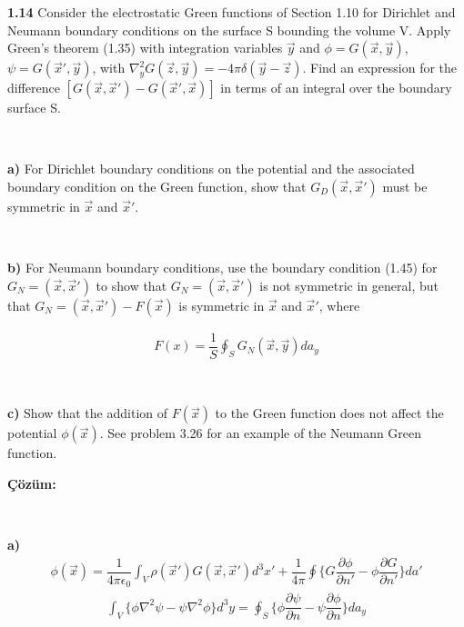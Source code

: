 \begin{flushleft}
   
	\textbf{1.14} Consider the electrostatic Green functions of Section 1.10 for Dirichlet and Neumann boundary conditions on the surface S bounding the volume V. Apply Green's theorem (1.35) with integration variables $\Vec{y}$ and $\phi = G(\Vec{x},\Vec{y})$, $\psi = G (\vec{x}', \Vec{y})$, with $\nabla^{2}_{y}G(\Vec{z},\Vec{y}) = -4\pi \delta  (\Vec{y}-\Vec{z})$. Find an expression for the difference $[ G(\Vec{x} ,\vec{x}' ) - G ( \vec{x}' , \Vec{x} )]$ in terms of an integral over the boundary surface S. 

\

\textbf{a)} For Dirichlet boundary conditions on the potential and the associated boundary condition on the Green function, show that $G_{D}(\Vec{x},\vec{x}') $	must be symmetric in $\Vec{x}$ and $\vec{x}'$.

\

\textbf{b)} For Neumann boundary conditions, use the boundary condition (1.45) for $G_{N} = ( \Vec{x} , \vec{x}')$ to show that $G_{N} = ( \Vec{x} , \vec{x}')$ is not symmetric in general, but that $G_{N} = ( \Vec{x} , \vec{x}') - F (\Vec{x})$ is symmetric in $\Vec{x}$ and $\vec{x}'$, where

\begin{align*}
    F (x) = \dfrac{1}{S} \oint_{S} G_{N} ( \Vec{x}, \Vec{y} ) da_{y}
\end{align*}

\

\textbf{c)} Show that the addition of $F(\Vec{x})$ to the Green function does not affect the potential $\phi(\Vec{x})$. See problem 3.26 for an example of the Neumann Green function.	
\end{flushleft}

  
\textbf{Çözüm:}

\

\textbf{a)}
\begin{align*}
  \phi ( \Vec{x}) =  \dfrac{1}{4 \pi \epsilon_{0}} \int_{V} \rho ( \vec{x}' )  G( \Vec{x} ,\vec{x}' ) d^{3} x' + \dfrac{1}{4 \pi} \oint \Bigg\{ G \dfrac{\partial \phi}{\partial n'} - \phi \dfrac{\partial G}{\partial n'}  \Bigg\} da'  
\end{align*}
\begin{align*}
\int_{V} \Bigg\{ \phi \nabla^{2} \psi - \psi \nabla^{2} \phi  \Bigg\} d^{3} y = \oint_{S} \Bigg\{  \phi \dfrac{\partial \psi}{\partial n} - \psi \dfrac{\partial \phi}{\partial n}\Bigg\} d a_{y}
\end{align*}

